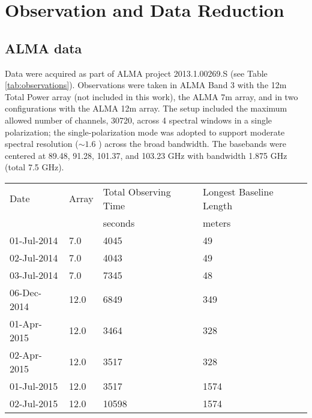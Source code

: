\documentclass[twocolumn]{aastex61}
\begin{document}
\section{Observation and Data Reduction}
\label{sec:observations}
\subsection{ALMA data}
Data were acquired as part of ALMA project 2013.1.00269.S (see Table
\ref{tab:observations}).  Observations were taken in ALMA Band 3 with the 12m
Total Power array (not included in this work), the ALMA 7m array, and in two
configurations with the ALMA 12m array.  The setup included the maximum allowed
number of channels, 30720, across 4 spectral windows in a single polarization;
the single-polarization mode was adopted to support moderate spectral
resolution ($\sim1.6$ \kms) across the broad bandwidth.  The basebands were
centered at 89.48, 91.28, 101.37, and 103.23 GHz with bandwidth 1.875 GHz (total
7.5 GHz).


\begin{table*}[htp]
\centering
\caption{Observation Summary}
\begin{tabular}{llll}
\label{tab:observations}
Date & Array & Total Observing Time &  Longest Baseline Length \\
     &       & seconds              & meters \\
\hline
01-Jul-2014 & 7.0 & 4045 & 49\\
02-Jul-2014 & 7.0 & 4043 & 49\\
03-Jul-2014 & 7.0 & 7345 & 48\\
06-Dec-2014 & 12.0 & 6849 & 349\\
01-Apr-2015 & 12.0 & 3464 & 328\\
02-Apr-2015 & 12.0 & 3517 & 328\\
01-Jul-2015 & 12.0 & 3517 & 1574\\
02-Jul-2015 & 12.0 & 10598 & 1574\\
\hline
\end{tabular}
\end{table*}
\end{document}

